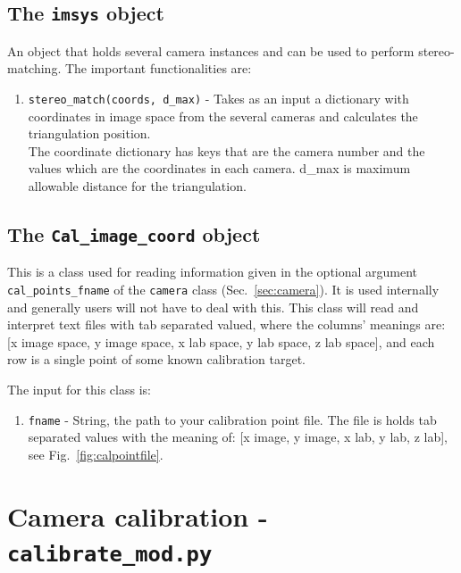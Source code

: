 \documentclass[10pt,a4paper]{article}
\begin{document}
\subsection{The \texttt{imsys} object}


An object that holds several camera instances and can be used to perform stereo-matching. The important functionalities are:


\begin{enumerate}
	\item \texttt{stereo\_match(coords, d\_max)} - Takes as an input a dictionary with coordinates in image space from the several cameras and calculates the triangulation position. \\ The coordinate dictionary has keys that are the camera number and the values which are the coordinates in each camera. d\_max is maximum allowable distance for the triangulation.
	
\end{enumerate}








\subsection{The \texttt{Cal\_image\_coord} object}\label{sec:calpointreader}

This is a class used for reading information given in the optional argument \texttt{cal\_points\_fname} of the \texttt{camera} class (Sec.~\ref{sec:camera}). It is used internally and generally users will not have to deal with this. This class will read and interpret text files with tab separated valued, where the columns' meanings are: [x image space, y image space, x lab space, y lab space, z lab space], and each row is a single point of some known calibration target.

The input for this class is:
\begin{enumerate}
	\item \texttt{fname} - String, the path to your calibration point file. The file is holds tab separated values with the meaning of: [x image, y image, x lab, y lab, z lab], see Fig.~\ref{fig:calpointfile}.
\end{enumerate}








\section{Camera calibration - \texttt{calibrate\_mod.py}}
\end{document}
